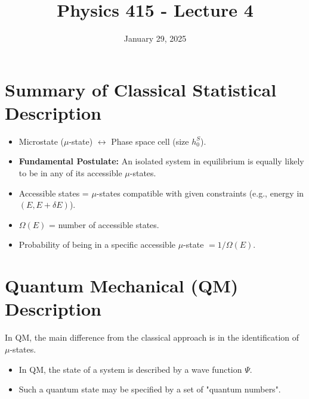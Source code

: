 \documentclass[11pt]{article}
\title{Physics 415 - Lecture 4}
\date{January 29, 2025}
\author{} %
\newcommand{\OmegaE}{\Omega(E)}
\newcommand{\deltaE}{\delta E}
\begin{document}
\maketitle
\thispagestyle{empty}

\section*{Summary of Classical Statistical Description}

\begin{itemize}
    \item Microstate ($\mu$-state) $\leftrightarrow$ Phase space cell (size $h_0^S$).
    \item \textbf{Fundamental Postulate:} An isolated system in equilibrium is equally likely to be in any of its accessible $\mu$-states.
    \item Accessible states = $\mu$-states compatible with given constraints (e.g., energy in $(E, E+\deltaE)$).
    \item $\OmegaE$ = number of accessible states.
    \item Probability of being in a specific accessible $\mu$-state $= 1/\OmegaE$.
\end{itemize}



\section*{Quantum Mechanical (QM) Description}

In QM, the main difference from the classical approach is in the identification of $\mu$-states.
\begin{itemize}
    \item In QM, the state of a system is described by a wave function $\Psi$.
    \item Such a quantum state may be specified by a set of "quantum numbers".
\end{itemize}
\end{document}
